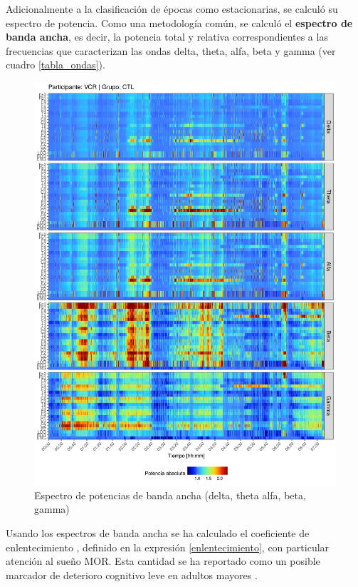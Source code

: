 Adicionalmente a la clasificación de épocas como estacionarias, se calculó su espectro de potencia. 
Como una metodología común, se calculó el \textbf{espectro de banda ancha},
es decir, la potencia total y relativa correspondientes a las frecuencias que caracterizan las ondas 
delta, theta, alfa, beta y gamma (ver cuadro \ref{tabla_ondas}).

\begin{figure}
\centering
\includegraphics[width=\linewidth]
{./img_art_dfa/VCNNS1_espectral_total.png} 
\caption[Espectro de potencias de banda ancha]{Espectro de potencias de banda ancha (delta, theta
alfa, beta, gamma)}
\end{figure}

Usando los espectros de banda ancha se ha calculado el coeficiente de enlentecimiento \lento, 
definido en la 
expresión \ref{enlentecimiento}, con particular atención al sueño MOR. Esta cantidad
se ha reportado como un posible marcador de deterioro cognitivo leve en adultos mayores 
\cite{Brayet16}.

